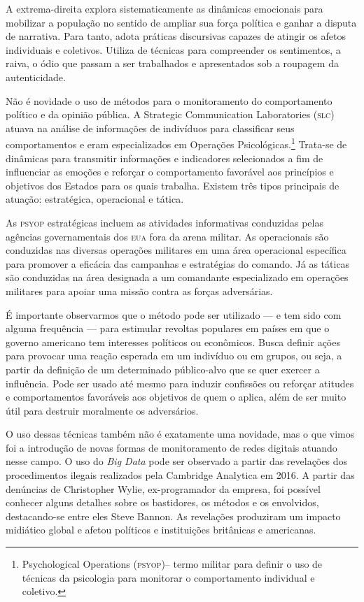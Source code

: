 A extrema-direita explora sistematicamente as dinâmicas emocionais para
mobilizar a população no sentido de ampliar sua força política e ganhar
a disputa de narrativa. Para tanto, adota práticas discursivas capazes
de atingir os afetos individuais e coletivos. Utiliza de técnicas para
compreender os sentimentos, a raiva, o ódio que passam a ser trabalhados
e apresentados sob a roupagem da autenticidade.

Não é novidade o uso de métodos para o monitoramento do comportamento
político e da opinião pública. A Strategic Communication Laboratories
(\textsc{slc}) atuava na análise de informações de indivíduos para classificar
seus comportamentos e eram especializados em Operações Psicológicas.\footnote{Psychological Operations (\textsc{psyop})-- termo militar para definir o uso de técnicas da psicologia
para monitorar o comportamento individual e coletivo.} Trata-se de
dinâmicas para transmitir informações e indicadores selecionados a fim
de influenciar as emoções e reforçar o comportamento favorável aos
princípios e objetivos dos Estados para os quais trabalha. Existem três
tipos principais de atuação: estratégica, operacional e tática.

As \textsc{psyop} estratégicas incluem as atividades informativas conduzidas
pelas agências governamentais dos \textsc{eua} fora da arena militar. As
operacionais são conduzidas nas diversas operações militares em uma área
operacional específica para promover a eficácia das campanhas e
estratégias do comando. Já as táticas são conduzidas na área designada a
um comandante especializado em operações militares para apoiar uma
missão contra as forças adversárias.

É importante observarmos que o método pode ser utilizado --- e tem sido
com alguma frequência --- para estimular revoltas populares em países em
que o governo americano tem interesses políticos ou econômicos. Busca
definir ações para provocar uma reação esperada em um indivíduo ou em
grupos, ou seja, a partir da definição de um determinado público-alvo
que se quer exercer a influência. Pode ser usado até mesmo para induzir
confissões ou reforçar atitudes e comportamentos favoráveis aos
objetivos de quem o aplica, além de ser muito útil para destruir
moralmente os adversários.

O uso dessas técnicas também não é exatamente uma novidade, mas o que
vimos foi a introdução de novas formas de monitoramento de redes
digitais atuando nesse campo. O uso do \textit{Big Data} pode ser observado a
partir das revelações dos procedimentos ilegais realizados pela
Cambridge Analytica em 2016. A partir das denúncias de Christopher
Wylie, ex-programador da empresa, foi possível conhecer alguns detalhes
sobre os bastidores, os métodos e os envolvidos, destacando-se entre
eles Steve Bannon. As revelações produziram um impacto midiático global
e afetou políticos e instituições britânicas e americanas.

